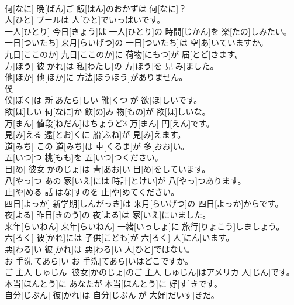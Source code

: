 \documentclass[8pt]{extreport}
\begin{document}
\begin{CJK}{UTF8}{min}
\\	何[なに]	晩[ばん]ご 飯[はん]のおかずは 何[なに]？		
\\	人[ひと]	プールは 人[ひと]でいっぱいです。		
\\	一人[ひとり]	今日[きょう]は 一人[ひとり]の 時間[じかん]を 楽[たの]しみたい。		
\\	一日[ついたち]	来月[らいげつ]の 一日[ついたち]は 空[あ]いていますか。		
\\	九日[ここのか]	九日[ここのか]に 荷物[にもつ]が 届[とど]きます。		
\\	方[ほう]	彼[かれ]は 私[わたし]の 方[ほう]を 見[み]ました。		
\\	他[ほか]	他[ほか]に 方法[ほうほう]がありません。		
\\	僕
\\	[ぼく]	僕[ぼく]は 新[あたら]しい 靴[くつ]が 欲[ほ]しいです。		
\\	欲[ほ]しい	何[なに]か 飲[の]み 物[もの]が 欲[ほ]しいな。		
\\	万[まん]	値段[ねだん]はちょうど3 万[まん] 円[えん]です。		
\\	見[み]える	遠[とお]くに 船[ふね]が 見[み]えます。		
\\	道[みち]	この 道[みち]は 車[くるま]が 多[おお]い。		
\\	五[いつ]つ	桃[もも]を 五[いつ]つください。		
\\	目[め]	彼女[かのじょ]は 青[あお]い 目[め]をしています。		
\\	八[やっ]つ	あの 家[いえ]には 時計[とけい]が 八[やっ]つあります。		
\\	止[や]める	話[はな]すのを 止[や]めてください。		
\\	四日[よっか]	新学期[しんがっき]は 来月[らいげつ]の 四日[よっか]からです。		
\\	夜[よる]	昨日[きのう]の 夜[よる]は 家[いえ]にいました。		
\\	来年[らいねん]	来年[らいねん] 一緒[いっしょ]に 旅行[りょこう]しましょう。		
\\	六[ろく]	彼[かれ]には 子供[こども]が 六[ろく] 人[にん]います。		
\\	悪[わる]い	彼[かれ]は 悪[わる]い 人[ひと]ではない。		
\\	お 手洗[てあら]い	お 手洗[てあら]いはどこですか。		
\\	ご 主人[しゅじん]	彼女[かのじょ]のご 主人[しゅじん]はアメリカ 人[じん]です。		
\\	本当[ほんとう]に	あなたが 本当[ほんとう]に 好[す]きです。		
\\	自分[じぶん]	彼[かれ]は 自分[じぶん]が 大好[だいす]きだ。		

\end{CJK}
\end{document}
